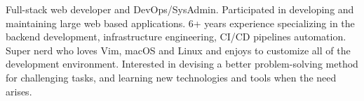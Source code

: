 

\begin{cvparagraph}
Full-stack web developer and DevOps/SysAdmin.
Participated in developing and maintaining large web based applications.
6+ years experience specializing in the backend development, infrastructure engineering, CI/CD pipelines automation.
Super nerd who loves Vim, macOS and Linux and enjoys to customize all of the development environment.
Interested in devising a better problem-solving method for challenging tasks, and learning new technologies and tools when the need arises.
\end{cvparagraph}
